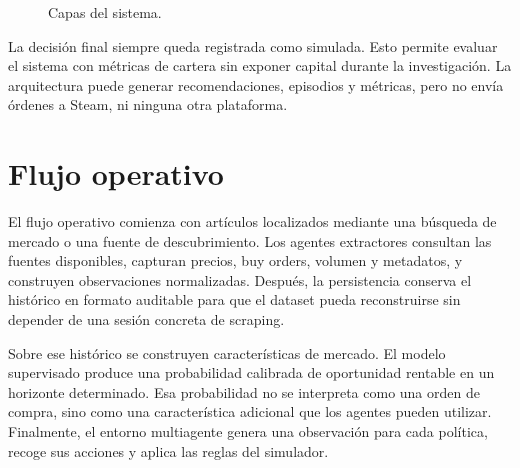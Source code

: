 \begin{figure}[h]
\centering
{}
\caption{Capas del sistema.}
\end{figure}

La decisión final siempre queda registrada como simulada. Esto permite evaluar el sistema con métricas de cartera sin exponer capital durante la investigación. La arquitectura puede generar recomendaciones, episodios y métricas, pero no envía órdenes a Steam,  ni ninguna otra plataforma.

\section{Flujo operativo}

El flujo operativo comienza con artículos localizados mediante una búsqueda de mercado o una fuente de descubrimiento. Los agentes extractores consultan las fuentes disponibles, capturan precios, buy orders, volumen y metadatos, y construyen observaciones normalizadas. Después, la persistencia conserva el histórico en formato auditable para que el dataset pueda reconstruirse sin depender de una sesión concreta de scraping.

Sobre ese histórico se construyen características de mercado. El modelo supervisado produce una probabilidad calibrada de oportunidad rentable en un horizonte determinado. Esa probabilidad no se interpreta como una orden de compra, sino como una característica adicional que los agentes  pueden utilizar. Finalmente, el entorno multiagente genera una observación para cada política, recoge sus acciones y aplica las reglas del simulador.

